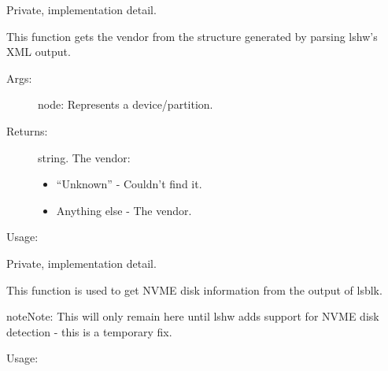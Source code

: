 \documentclass[letterpaper,10pt,english]{sphinxmanual}
\begin{document}
\begin{fulllineitems}
\label{\detokenize{linux:getdevinfo.linux.get_vendor}}
Private, implementation detail.

This function gets the vendor from the structure generated
by parsing lshw’s XML output.
\begin{description}
\item[{Args:}] \leavevmode
node:   Represents a device/partition.

\item[{Returns:}] \leavevmode
string. The vendor:
\begin{itemize}
\item {} 
“Unknown”     - Couldn’t find it.

\item {} 
Anything else - The vendor.

\end{itemize}

\end{description}

Usage:

\begin{sphinxVerbatim}[commandchars=\\\{\}]
  
\end{sphinxVerbatim}

\end{fulllineitems}


\begin{fulllineitems}
\label{\detokenize{linux:getdevinfo.linux.parse_lsblk_output}}
Private, implementation detail.

This function is used to get NVME disk information from the output of lsblk.

\begin{sphinxadmonition}{note}{Note:}
This will only remain here until lshw adds support for NVME disk detection -
this is a temporary fix.
\end{sphinxadmonition}

Usage:

\begin{sphinxVerbatim}[commandchars=\\\{\}]
\end{sphinxVerbatim}

\end{fulllineitems}
\end{document}
